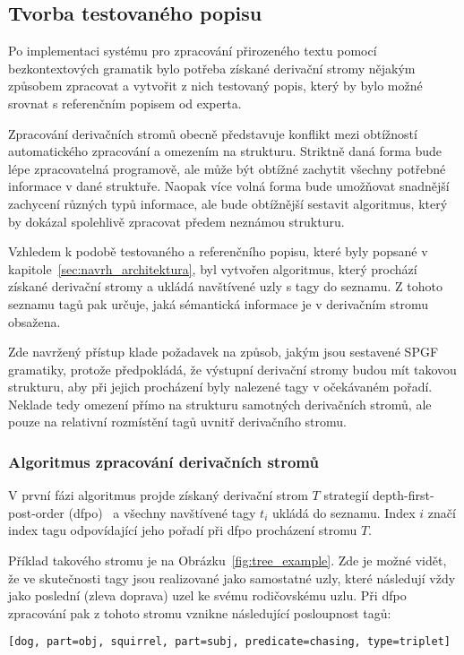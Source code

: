 \subsection{Tvorba testovaného popisu}
Po implementaci systému pro zpracování přirozeného textu pomocí bezkontextových gramatik bylo potřeba získané derivační stromy nějakým způsobem
zpracovat a vytvořit z nich testovaný popis, který by bylo možné srovnat s referenčním popisem od experta.

Zpracování derivačních stromů obecně představuje konflikt mezi obtížností automatického zpracování a omezením na strukturu.
Striktně daná forma bude lépe zpracovatelná programově, ale může být obtížné zachytit všechny potřebné informace v dané struktuře.
Naopak více volná forma bude umožňovat snadnější zachycení různých typů informace, ale bude obtížnější sestavit algoritmus,
který by dokázal spolehlivě zpracovat předem neznámou strukturu.

Vzhledem k podobě testovaného a referenčního popisu, které byly popsané v kapitole~\ref{sec:navrh_architektura},
byl vytvořen algoritmus, který prochází získané derivační stromy a ukládá navštívené uzly s tagy do seznamu.
Z tohoto seznamu tagů pak určuje, jaká sémantická informace je v derivačním stromu obsažena.

Zde navržený přístup klade požadavek na způsob, jakým jsou sestavené SPGF gramatiky, protože předpokládá, že výstupní derivační stromy
budou mít takovou strukturu, aby při jejich procházení byly nalezené tagy v očekávaném pořadí.
Neklade tedy omezení přímo na strukturu samotných derivačních stromů, ale pouze na relativní rozmístění tagů uvnitř derivačního stromu.

\subsubsection{Algoritmus zpracování derivačních stromů}\label{subsubsec:algoritmus_zpracovani_stromu}
V první fázi algoritmus projde získaný derivační strom $T$ strategií depth-first-post-order (dfpo)~\cite{taocp1} a všechny navštívené tagy $t_{i}$ ukládá do seznamu.
Index $i$ značí index tagu odpovídající jeho pořadí při dfpo procházení stromu $T$.

Příklad takového stromu je na Obrázku~\ref{fig:tree_example}.
Zde je možné vidět, že ve skutečnosti tagy jsou realizované jako samostatné uzly, které následují vždy jako poslední (zleva doprava) uzel ke svému rodičovskému uzlu.
Při dfpo zpracování pak z tohoto stromu vznikne následující posloupnost tagů:
\begin{center}
	\texttt{[dog, part=obj, squirrel, part=subj, predicate=chasing, type=triplet]}
\end{center}

